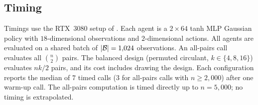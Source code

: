 \subsection{Timing}
\label{app:exp-details:timing}

Timings use the RTX~3080 setup of . Each agent is a
$2\times64$ tanh MLP Gaussian policy with $18$-dimensional observations and
$2$-dimensional actions. All agents are evaluated on a shared batch of
$\lvert\mathcal B\rvert=1{,}024$ observations. An all-pairs call evaluates all $\binom n2$ pairs.
The balanced design (permuted circulant, $k\in\{4,8,16\}$) evaluates $nk/2$ pairs, and its cost includes drawing the
design. Each configuration reports the median of $7$ timed calls ($3$ for
all-pairs calls with $n\ge2{,}000$) after one warm-up call. The all-pairs computation is timed directly up to $n=5{,}000$; no timing is extrapolated.
